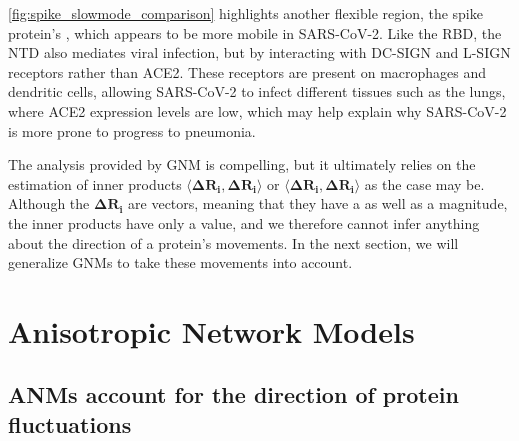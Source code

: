 
\autoref{fig:spike_slowmode_comparison} highlights another flexible region, the spike protein's , which appears to be more mobile in SARS-CoV-2. Like the RBD, the NTD also mediates viral infection, but by interacting with DC-SIGN and L-SIGN receptors rather than ACE2. These receptors are present on macrophages and dendritic cells, allowing SARS-CoV-2 to infect different tissues such as the lungs, where ACE2 expression levels are low, which may help explain why SARS-CoV-2 is more prone to progress to pneumonia.

The analysis provided by GNM is compelling, but it ultimately relies on the estimation of inner products $ \langle \mathbf{\Delta R_i}, \mathbf{\Delta R_i} \rangle $ or $ \langle \mathbf{\Delta R_i}, \mathbf{\Delta R_i} \rangle $ as the case may be. Although the $ \mathbf{\Delta R_i} $ are vectors, meaning that they have a  as well as a magnitude, the inner products have only a value, and we therefore cannot infer anything about the direction of a protein's movements. In the next section, we will generalize GNMs to take these movements into account.\\

\FloatBarrier
{}
\section{Anisotropic Network Models}

\FloatBarrier
{}
\subsection{ANMs account for the direction of protein fluctuations}

